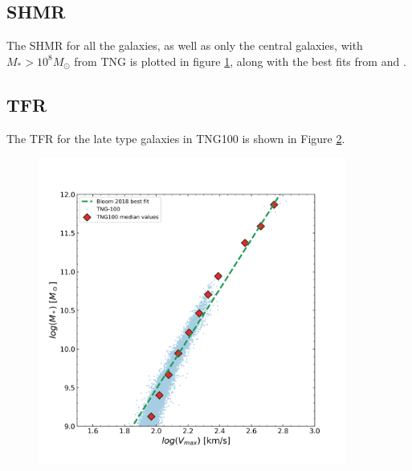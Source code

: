 
\subsection{SHMR}
The SHMR for all the galaxies, as well as only the central galaxies, with $M_{*} > 10^8 M_{\odot}$ from TNG is plotted in figure \ref{shmr_res}, along with the best fits from \cite{Moster2012} and \cite{Behroozi2013}.


\begin{figure}
    \centering
    \caption{}
    \label{shmr_res}
\end{figure}


\subsection{TFR}
The TFR for the late type galaxies in TNG100 is shown in Figure \ref{tfr_res}. 

\begin{figure}
    \centering
    \includegraphics[width=0.9\textwidth]{images/results_tully_fisher.png}
    \caption{}
    \label{tfr_res}
\end{figure}

